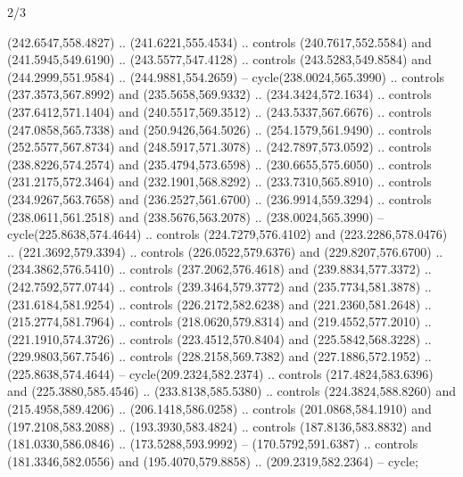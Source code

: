 \begin{flagdescription}{2/3}
\begin{scope}
\begin{scope}[xshift=0.45\flagwidth*\stretchfactor]
\begin{scope}[xshift=-0.45\flagwidth,yshift=\flagwidth,scale=0.0016667\flagwidth]
\begin{scope}[y=1pt, x=1pt, yscale=-1]
  (242.6547,558.4827) .. (241.6221,555.4534) .. controls (240.7617,552.5584) and
  (241.5945,549.6190) .. (243.5577,547.4128) .. controls (243.5283,549.8584) and
  (244.2999,551.9584) .. (244.9881,554.2659) -- cycle(238.0024,565.3990) ..
  controls (237.3573,567.8992) and (235.5658,569.9332) .. (234.3424,572.1634) ..
  controls (237.6412,571.1404) and (240.5517,569.3512) .. (243.5337,567.6676) ..
  controls (247.0858,565.7338) and (250.9426,564.5026) .. (254.1579,561.9490) ..
  controls (252.5577,567.8734) and (248.5917,571.3078) .. (242.7897,573.0592) ..
  controls (238.8226,574.2574) and (235.4794,573.6598) .. (230.6655,575.6050) ..
  controls (231.2175,572.3464) and (232.1901,568.8292) .. (233.7310,565.8910) ..
  controls (234.9267,563.7658) and (236.2527,561.6700) .. (236.9914,559.3294) ..
  controls (238.0611,561.2518) and (238.5676,563.2078) .. (238.0024,565.3990) --
  cycle(225.8638,574.4644) .. controls (224.7279,576.4102) and
  (223.2286,578.0476) .. (221.3692,579.3394) .. controls (226.0522,579.6376) and
  (229.8207,576.6700) .. (234.3862,576.5410) .. controls (237.2062,576.4618) and
  (239.8834,577.3372) .. (242.7592,577.0744) .. controls (239.3464,579.3772) and
  (235.7734,581.3878) .. (231.6184,581.9254) .. controls (226.2172,582.6238) and
  (221.2360,581.2648) .. (215.2774,581.7964) .. controls (218.0620,579.8314) and
  (219.4552,577.2010) .. (221.1910,574.3726) .. controls (223.4512,570.8404) and
  (225.5842,568.3228) .. (229.9803,567.7546) .. controls (228.2158,569.7382) and
  (227.1886,572.1952) .. (225.8638,574.4644) -- cycle(209.2324,582.2374) ..
  controls (217.4824,583.6396) and (225.3880,585.4546) .. (233.8138,585.5380) ..
  controls (224.3824,588.8260) and (215.4958,589.4206) .. (206.1418,586.0258) ..
  controls (201.0868,584.1910) and (197.2108,583.2088) .. (193.3930,583.4824) ..
  controls (187.8136,583.8832) and (181.0330,586.0846) .. (173.5288,593.9992) --
  (170.5792,591.6387) .. controls (181.3346,582.0556) and (195.4070,579.8858) ..
  (209.2319,582.2364) -- cycle;
\end{scope}
\end{scope}
\end{scope}
\fi
\end{scope}
\framecode{}
\end{flagdescription}
